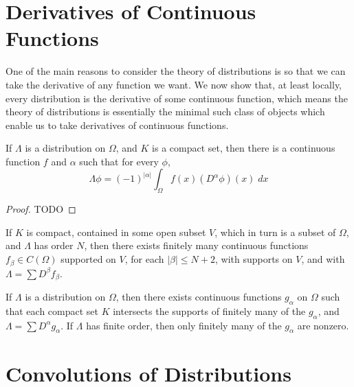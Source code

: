 \section{Derivatives of Continuous Functions}

One of the main reasons to consider the theory of distributions is so that we can take the derivative of any function we want. We now show that, at least locally, every distribution is the derivative of some continuous function, which means the theory of distributions is essentially the minimal such class of objects which enable us to take derivatives of continuous functions.

\begin{theorem}
    If $\Lambda$ is a distribution on $\Omega$, and $K$ is a compact set, then there is a continuous function $f$ and $\alpha$ such that for every $\phi$,
    \[ \Lambda \phi = (-1)^{|\alpha|} \int_\Omega f(x) (D^\alpha \phi)(x)\; dx \]
\end{theorem}
\begin{proof}
    TODO
\end{proof}

\begin{theorem}
    If $K$ is compact, contained in some open subset $V$, which in turn is a subset of $\Omega$, and $\Lambda$ has order $N$, then there exists finitely many continuous functions $f_\beta \in C(\Omega)$ supported on $V$, for each $|\beta| \leq N + 2$, with supports on $V$, and with $\Lambda = \sum D^\beta f_\beta$.
\end{theorem}

\begin{theorem}
    If $\Lambda$ is a distribution on $\Omega$, then there exists continuous functions $g_\alpha$ on $\Omega$ such that each compact set $K$ intersects the supports of finitely many of the $g_\alpha$, and $\Lambda = \sum D^\alpha g_\alpha$. If $\Lambda$ has finite order, then only finitely many of the $g_\alpha$ are nonzero.
\end{theorem}

\section{Convolutions of Distributions}


